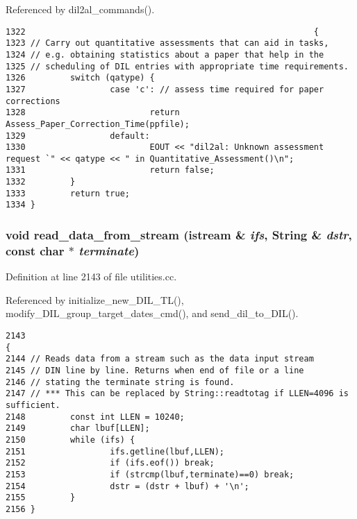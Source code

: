 Referenced by dil2al\_\-commands().



\footnotesize\begin{verbatim}1322                                                          {
1323 // Carry out quantitative assessments that can aid in tasks,
1324 // e.g. obtaining statistics about a paper that help in the
1325 // scheduling of DIL entries with appropriate time requirements.
1326         switch (qatype) {
1327                 case 'c': // assess time required for paper corrections
1328                         return Assess_Paper_Correction_Time(ppfile);
1329                 default:
1330                         EOUT << "dil2al: Unknown assessment request `" << qatype << " in Quantitative_Assessment()\n";
1331                         return false;
1332         }
1333         return true;
1334 }
\end{verbatim}\normalsize 
{}
\subsubsection{\setlength{\rightskip}{0pt plus 5cm}void read\_\-data\_\-from\_\-stream (istream \& {\em ifs}, {\bf String} \& {\em dstr}, const char $\ast$ {\em terminate})}\label{dil2al_8hh_a239}




Definition at line 2143 of file utilities.cc.

Referenced by initialize\_\-new\_\-DIL\_\-TL(), modify\_\-DIL\_\-group\_\-target\_\-dates\_\-cmd(), and send\_\-dil\_\-to\_\-DIL().



\footnotesize\begin{verbatim}2143                                                                                  {
2144 // Reads data from a stream such as the data input stream
2145 // DIN line by line. Returns when end of file or a line
2146 // stating the terminate string is found.
2147 // *** This can be replaced by String::readtotag if LLEN=4096 is sufficient.
2148         const int LLEN = 10240;
2149         char lbuf[LLEN];
2150         while (ifs) {
2151                 ifs.getline(lbuf,LLEN);
2152                 if (ifs.eof()) break;
2153                 if (strcmp(lbuf,terminate)==0) break;
2154                 dstr = (dstr + lbuf) + '\n';
2155         }
2156 }
\end{verbatim}\normalsize 
{}
